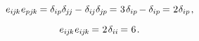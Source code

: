 \begin{otherlanguage}{russian}
\nopagebreak\vspace{-0.15em}\begin{equation*}
e_{i\hspace{-0.1ex}j\hspace{-0.1ex}k} \hspace{.1ex} e_{pj\hspace{-0.1ex}k} \hspace{-0.15ex}
= \delta_{ip} \delta_{\hspace{-0.1ex}j\hspace{-0.12ex}j} \hspace{-0.1ex} - \hspace{.1ex} \delta_{i\hspace{-0.1ex}j} \delta_{\hspace{-0.1ex}j\hspace{-0.1ex}p} \hspace{-0.15ex}
= \hspace{.1ex} 3 \hspace{.2ex} \delta_{ip} \hspace{-0.2ex} - \delta_{ip} \hspace{-0.15ex}
= \hspace{.1ex} 2 \hspace{.1ex} \delta_{ip}
\hspace{.2ex} ,
\end{equation*}

\nopagebreak\vspace{-0.15em}\begin{equation*}
e_{i\hspace{-0.1ex}j\hspace{-0.1ex}k} \hspace{.1ex} e_{i\hspace{-0.1ex}j\hspace{-0.1ex}k} \hspace{-0.15ex}
= \hspace{.1ex} 2 \hspace{.2ex} \delta_{ii} \hspace{-0.15ex}
= \hspace{.1ex} 6
\hspace{.2ex} .
\end{equation*}

\vspace{-0.33em} \noindent {} 


\end{otherlanguage}
